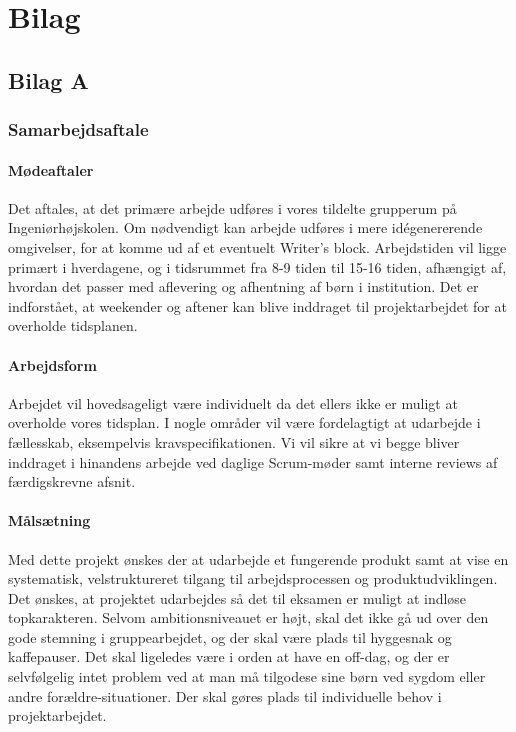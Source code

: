 \newpage
\appendix	
\chapter{Bilag}

\section{Bilag A}

\subsection{Samarbejdsaftale}
\label{App:samarbejdsaftale}

\subsubsection{Mødeaftaler}
Det aftales, at det primære arbejde udføres i vores tildelte grupperum på Ingeniørhøjskolen. Om nødvendigt kan arbejde udføres i mere idégenererende omgivelser, for at komme ud af et eventuelt Writer’s block. Arbejdstiden vil ligge primært i hverdagene, og i tidsrummet fra 8-9 tiden til 15-16 tiden, afhængigt af, hvordan det passer med aflevering og afhentning af børn i institution. Det er indforstået, at weekender og aftener kan blive inddraget til projektarbejdet for at overholde tidsplanen.

\subsubsection{Arbejdsform}
Arbejdet vil hovedsageligt være individuelt da det ellers ikke er muligt at overholde vores tidsplan. I nogle områder vil være fordelagtigt at udarbejde i fællesskab, eksempelvis kravspecifikationen. Vi vil sikre at vi begge bliver inddraget i hinandens arbejde ved daglige Scrum-møder samt interne reviews af færdigskrevne afsnit. 

\subsubsection{Målsætning}  
Med dette projekt ønskes der at udarbejde et fungerende produkt samt at vise en systematisk, velstruktureret tilgang til arbejdsprocessen og produktudviklingen. Det ønskes, at projektet udarbejdes så det til eksamen er muligt at indløse topkarakteren. Selvom ambitionsniveauet er højt, skal det ikke gå ud over den gode stemning i gruppearbejdet, og der skal være plads til hyggesnak og kaffepauser. Det skal ligeledes være i orden at have en off-dag, og der er selvfølgelig intet problem ved at man må tilgodese sine børn ved sygdom eller andre forældre-situationer. Der skal gøres plads til individuelle behov i projektarbejdet.

